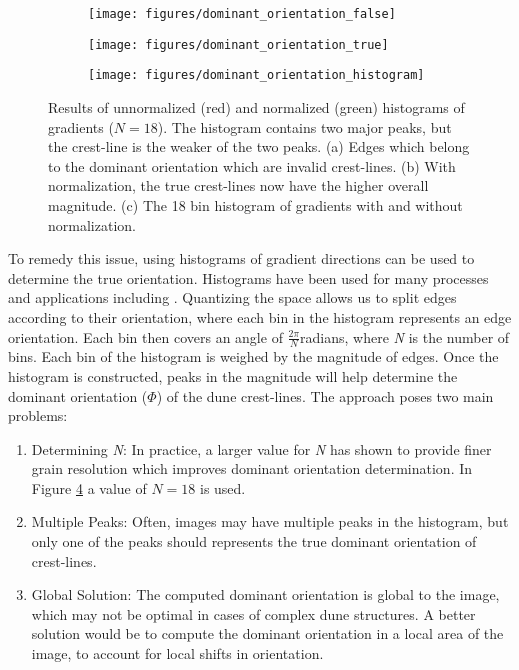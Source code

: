 \documentclass[review]{elsarticle}
\begin{document}
\begin{figure}
	\centering
	\begin{subfigure}{0.48\textwidth}
		\centering
		\texttt{[image: figures/dominant\_orientation\_false]}
		\caption{}
		\label{fig:false_dominant_orientation_image}
	\end{subfigure}
	\begin{subfigure}{0.48\textwidth}
		\centering
		\texttt{[image: figures/dominant\_orientation\_true]}
		\caption{}
		\label{fig:true_dominant_orientation_image}
	\end{subfigure}
	\begin{subfigure}{\textwidth}
		\centering
		\texttt{[image: figures/dominant\_orientation\_histogram]}
		\caption{}
		\label{fig:dominant_orientation_histogram}
	\end{subfigure}
	
	\caption{Results of unnormalized (red) and normalized (green) histograms of gradients ($N=18$). The histogram contains two major peaks, but the crest-line is the weaker of the two peaks. (a) Edges which belong to the dominant orientation which are invalid crest-lines. (b) With normalization, the true crest-lines now have the higher overall magnitude. (c) The 18 bin histogram of gradients with and without normalization.}
	\label{fig:computing_dominant_orientation}
\end{figure}

To remedy this issue, using histograms of gradient directions can be used to determine the true orientation. Histograms have been used for many processes and applications including \cite{lowe_sift_paper, dalal_histogram_oriented_gradients_human_detection, hu_gradient_field_descriptor}. Quantizing the space allows us to split edges according to their orientation, where each bin in the histogram represents an edge orientation. Each bin then covers an angle of $\frac{2\pi}{N}$radians, where \emph{N} is the number of bins. Each bin of the histogram is weighed by the magnitude of edges. Once the histogram is constructed, peaks in the magnitude
will help determine the dominant orientation ($\varPhi$) of the dune
crest-lines. The approach poses two main problems:

\begin{enumerate}
	\item Determining \emph{N}: In practice, a larger value for \emph{N} has shown to provide finer grain resolution which improves dominant orientation determination. In Figure \ref{fig:computing_dominant_orientation} a value of $N=18$ is used.
	\item Multiple Peaks: Often, images may have multiple peaks
	in the histogram, but only one of the peaks should represents the
	true dominant orientation of crest-lines.
	\item Global Solution: The computed dominant orientation is global to the image, which may not be optimal in cases of complex dune structures. A better solution would be to compute the dominant orientation in a local area of the image, to account for local shifts in orientation.
\end{enumerate}
\end{document}
